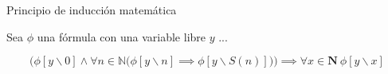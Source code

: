 \begin{axiom} \label{nat_ind}
	Principio de inducción matemática
	\begin{center}
		Sea $\phi$ una fórmula con una variable libre $y$ ...
	\end{center}
	\begin{equation}
		{\bigg (}\phi \left[y\backslash0\right] \land \forall n \in \mathbb{N}{\Big (}\phi\left[y\backslash n\right] \implies \phi\left[y \backslash S(n)\right]{\Big )}{\bigg )} \implies \forall x \in \mathbf{N}\ \phi \left[y \backslash x\right]
	\end{equation}
\end{axiom}
